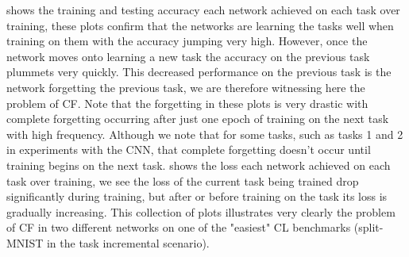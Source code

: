  shows the training and testing accuracy each network achieved on each task over training, these plots confirm that the networks are learning the tasks well when training on them with the accuracy jumping very high. However, once the network moves onto learning a new task the accuracy on the previous task plummets very quickly. This decreased performance on the previous task is the network forgetting the previous task, we are therefore witnessing here the problem of CF. Note that the forgetting in these plots is very drastic with complete forgetting occurring after just one epoch of training on the next task with high frequency. Although we note that for some tasks, such as tasks 1 and 2 in experiments with the CNN, that complete forgetting doesn't occur until training begins on the next task.  shows the loss each network achieved on each task over training, we see the loss of the current task being trained drop significantly during training, but after or before training on the task its loss is gradually increasing. This collection of plots illustrates very clearly the problem of CF in two different networks on one of the "easiest" CL benchmarks (split-MNIST in the task incremental scenario). 



